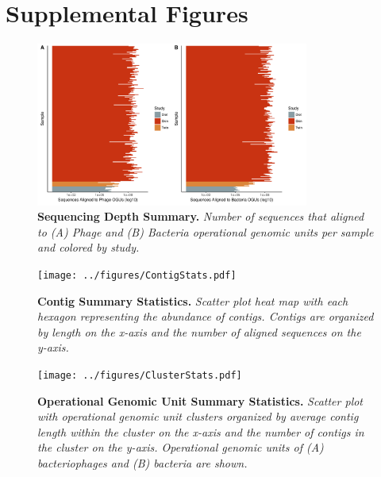 \documentclass[12pt,]{article}
\newcommand{\beginsupplement}{%
        \setcounter{table}{0}
        \renewcommand{\thetable}{S\arabic{table}}%
        \setcounter{figure}{0}
        \renewcommand{\thefigure}{S\arabic{figure}}%
     }
\begin{document}
\section{Supplemental Figures}\label{supplemental-figures}

\beginsupplement

\begin{figure}[htbp]
\centering
\includegraphics[width=0.80000\textwidth]{../figures/SequenceAbund.pdf}
\caption{\textbf{Sequencing Depth Summary.} \emph{Number of sequences
that aligned to (A) Phage and (B) Bacteria operational genomic units per
sample and colored by study.}\label{SequenceStats}}
\end{figure}

\newpage

\begin{figure}[htbp]
\centering
\texttt{[image: ../figures/ContigStats.pdf]}
\caption{\textbf{Contig Summary Statistics.} \emph{Scatter plot heat map
with each hexagon representing the abundance of contigs. Contigs are
organized by length on the x-axis and the number of aligned sequences on
the y-axis.}\label{ContigStats}}
\end{figure}

\newpage

\begin{figure}[htbp]
\centering
\texttt{[image: ../figures/ClusterStats.pdf]}
\caption{\textbf{Operational Genomic Unit Summary Statistics.}
\emph{Scatter plot with operational genomic unit clusters organized by
average contig length within the cluster on the x-axis and the number of
contigs in the cluster on the y-axis. Operational genomic units of (A)
bacteriophages and (B) bacteria are shown.}\label{ClusterStats}}
\end{figure}

\newpage
\end{document}
